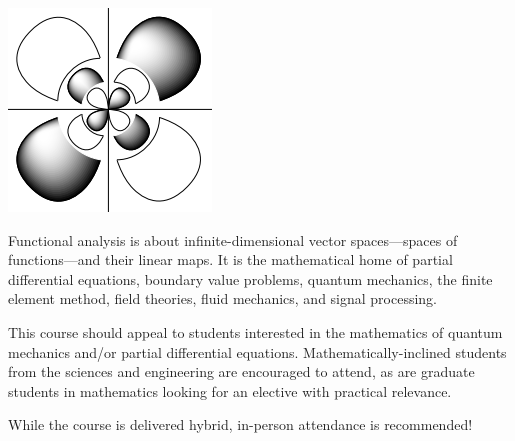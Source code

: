 \documentclass[12pt]{amsart}
\begin{document}
\begin{minipage}[t]{0.35\textwidth}
\smallskip

\centering
\includegraphics[width=\textwidth]{../../images/boundstates.png}
\end{minipage}
\hfill
\begin{minipage}[t]{0.55\textwidth} \vspace{0mm} Functional analysis is about infinite-dimensional vector spaces---spaces of functions---and their linear maps.  It is the mathematical home of partial differential equations, boundary value problems, quantum mechanics, the finite element method, field theories, fluid mechanics, and signal processing.

\medskip
\noindent This course should appeal to students interested in the mathematics of quantum mechanics and/or partial differential equations.  Mathematically-inclined students from the sciences and engineering are encouraged to attend, as are graduate students in mathematics looking for an elective with practical relevance.
\end{minipage}

\bigskip
\noindent While the course is delivered hybrid, in-person attendance is recommended!
\end{document}
